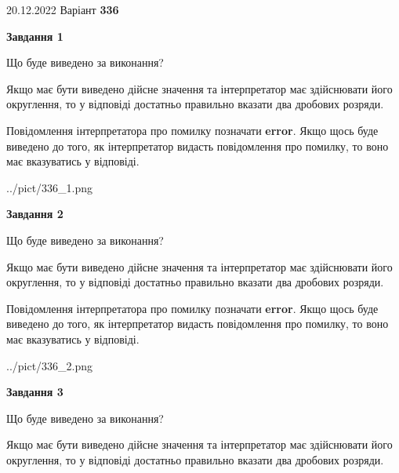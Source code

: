 \documentclass[12pt, ukrainian]{article}
\begin{document}
{20.12.2022 Варіант \No \textbf { 336 }\par}
{
\begin {Large}

{\begin {center}\textbf{Завдання 1}\end {center}}\par
Що буде виведено за виконання? \par

Якщо має бути виведено дійсне значення та інтерпретатор має здійснювати його округлення, 
то у відповіді достатньо правильно вказати два дробових розряди.

Повідомлення інтерпретатора про помилку позначати \textbf{error}.
Якщо щось буде виведено до того, як інтерпретатор видасть повідомлення про помилку, 
то воно має вказуватись у відповіді. \par

\begin{center}
	{../pict/336_1.png}
\end{center}
\newpage

{\begin {center}\textbf{Завдання 2}\end {center}}\par
Що буде виведено за виконання? \par

Якщо має бути виведено дійсне значення та інтерпретатор має здійснювати його округлення, 
то у відповіді достатньо правильно вказати два дробових розряди.

Повідомлення інтерпретатора про помилку позначати \textbf{error}.
Якщо щось буде виведено до того, як інтерпретатор видасть повідомлення про помилку, 
то воно має вказуватись у відповіді. \par

\begin{center}
	{../pict/336_2.png}
\end{center}
\newpage

{\begin {center}\textbf{Завдання 3}\end {center}}\par
Що буде виведено за виконання? \par

Якщо має бути виведено дійсне значення та інтерпретатор має здійснювати його округлення, 
то у відповіді достатньо правильно вказати два дробових розряди.


\end{Large}}
\end{document}
